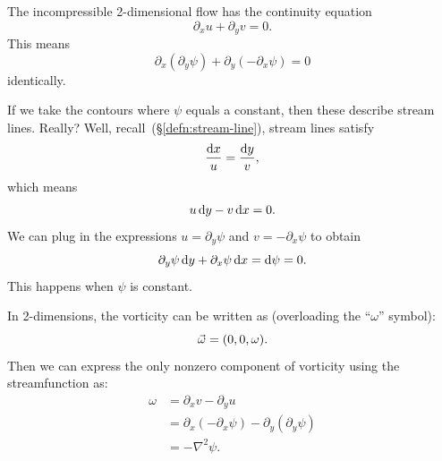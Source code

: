 \begin{node}
The incompressible 2-dimensional flow has the continuity equation
\begin{equation}
\partial_{x}u+\partial_{y}v=0.
\end{equation}
This means
\begin{equation}
\partial_{x}(\partial_{y}\psi)+\partial_{y}(-\partial_{x}\psi)=0
\end{equation}
identically.
\end{node}

\begin{node}
If we take the contours where $\psi$ equals a constant, then these
describe stream lines. Really?
Well, recall~(\S\ref{defn:stream-line}), stream lines satisfy
\begin{equation}
\frac{\mathrm{d} x}{u}=\frac{\mathrm{d} y}{v},
\end{equation}
which means
\begin{equation}
u\,\mathrm{d} y-v\,\mathrm{d} x = 0.
\end{equation}
We can plug in the expressions $u=\partial_{y}\psi$ and $v=-\partial_{x}\psi$
to obtain
\begin{equation}
\partial_{y}\psi\,\mathrm{d} y+\partial_{x}\psi\,\mathrm{d} x=\mathrm{d}\psi=0.
\end{equation}
This happens when $\psi$ is constant.
\end{node}

\begin{node}
In 2-dimensions, the vorticity can be written as (overloading the
``$\omega$'' symbol):
\begin{equation}
\vec{\omega}=(0,0,\omega).
\end{equation}
Then we can express the only nonzero component of vorticity using the
streamfunction as:
\begin{subequations}
  \begin{align}
\omega &= \partial_{x}v-\partial_{y}u\\
&=\partial_{x}(-\partial_{x}\psi)-\partial_{y}(\partial_{y}\psi)\\
&=-\nabla^{2}\psi.
  \end{align}
\end{subequations}
\end{node}

